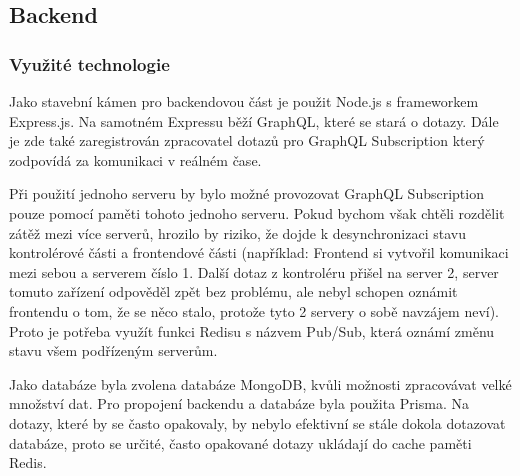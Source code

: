 \subsection{Backend}

\subsubsection{Využité technologie}
Jako stavební kámen pro backendovou část je použit Node.js s frameworkem Express.js. Na samotném Expressu běží GraphQL, které se stará o dotazy. Dále je zde také zaregistrován zpracovatel dotazů pro GraphQL Subscription který zodpovídá za komunikaci v reálném čase.\par
Při použití jednoho serveru by bylo možné provozovat GraphQL Subscription pouze pomocí paměti tohoto jednoho serveru. Pokud bychom však chtěli rozdělit zátěž mezi více serverů, hrozilo by riziko, že dojde k desynchronizaci stavu kontrolérové části a frontendové části (například: Frontend si vytvořil komunikaci mezi sebou a serverem číslo 1. Další dotaz z kontroléru přišel na server 2, server tomuto zařízení odpověděl zpět bez problému, ale nebyl schopen oznámit frontendu o tom, že se něco stalo, protože tyto 2 servery o sobě navzájem neví). Proto je potřeba využít funkci Redisu s názvem Pub/Sub\cite{PubSub}, která oznámí změnu stavu všem podřízeným serverům.\par
Jako databáze byla zvolena databáze MongoDB, kvůli možnosti zpracovávat velké množství dat. Pro propojení backendu a databáze byla použita Prisma. Na dotazy, které by se často opakovaly, by nebylo efektivní se stále dokola dotazovat databáze, proto se určité, často opakované dotazy ukládají do cache paměti Redis.\par

